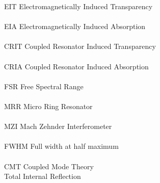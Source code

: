 
EIT Electromagnetically Induced Transparency\\
\\EIA Electromagnetically Induced Absorption\\
\\CRIT Coupled Resonator Induced Transparency\\
\\CRIA Coupled Resonator Induced Absorption\\
\\FSR Free Spectral Range\\
\\MRR Micro Ring Resonator\\
\\MZI Mach Zehnder Interferometer\\
\\FWHM Full width at half maximum\\
\\CMT Coupled Mode Theory%
\\ Total Internal Reflection